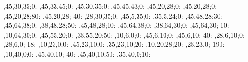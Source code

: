\begin{chart}
,45,30,35;0:    %
,45,33,45;0:    %
,45,30,35;0:    %
,45,45,43;0:    %
,45,20,28;0:    %
,45,20,28;0:    %
,45,20,28;80:   %
,45,20,28;-40:  %
,28,30,35;0:    %
,45,5,35;0:     %
,35,5,24;0:     %
,45,48,28;30:   %
,45,64,38;0:    %
,38,48,28;50:   %
,45,48,28;10:   %
,45,64,38;0:    %
,38,64,30;0:    %
,45,64,30;-10:  %
,10,64,30;0:    %
,45,55,20;0:    %
,38,55,20;50:   %
,10,6,0;0:       %
,45,6,10;0:     %
,45,6,10;-40:   %
,28,6,10;0:     %
,28,6,0;-18:    %
,10,23,0;0:     %
,45,23,10;0:    %
,35,23,10;20:   %
,10,20,28;20:    %
,28,23,0;-190:  %
,10,40,0;0:     %
,45,40,10;-40:  %
,45,40,10;50:   %
,35,40,0;10:    %
\end{chart}
\egroup
